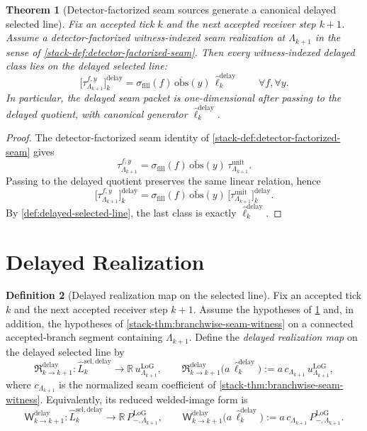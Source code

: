 \documentclass[11pt]{article}
\theoremstyle{definition}
\newtheorem{definition}{Definition}[section]
\theoremstyle{plain}
\newtheorem{theorem}[definition]{Theorem}
\theoremstyle{remark}
\begin{document}
\begin{theorem}[Detector-factorized seam sources generate a canonical delayed selected line]
\label{thm:delayed-selected-line}
Fix an accepted tick \(k\) and the next accepted receiver step \(k+1\).
Assume a detector-factorized witness-indexed seam realization at \(\Lambda_{k+1}\) in the sense of
\cref{stack-def:detector-factorized-seam}.
Then every witness-indexed delayed class lies on the delayed selected line:
\[
\big[\tau^{f,y}_{\Lambda_{k+1}}\big]^{\mathrm{delay}}_k
=
\sigma_{\mathrm{fill}}(f)\,
\overline{\mathrm{obs}}(y)\,
\widehat\ell^{\mathrm{delay}}_k
\qquad
\forall f,\forall y.
\]
In particular, the delayed seam packet is one-dimensional after passing to the delayed quotient,
with canonical generator \(\widehat\ell^{\mathrm{delay}}_k\).
\end{theorem}

\begin{proof}
The detector-factorized seam identity of \cref{stack-def:detector-factorized-seam} gives
\[
\tau^{f,y}_{\Lambda_{k+1}}
=
\sigma_{\mathrm{fill}}(f)\,
\overline{\mathrm{obs}}(y)\,
\tau^{\mathrm{unit}}_{\Lambda_{k+1}}.
\]
Passing to the delayed quotient preserves the same linear relation, hence
\[
\big[\tau^{f,y}_{\Lambda_{k+1}}\big]^{\mathrm{delay}}_k
=
\sigma_{\mathrm{fill}}(f)\,
\overline{\mathrm{obs}}(y)\,
\big[\tau^{\mathrm{unit}}_{\Lambda_{k+1}}\big]^{\mathrm{delay}}_k.
\]
By \cref{def:delayed-selected-line}, the last class is exactly
\(
\widehat\ell^{\mathrm{delay}}_k
\).
\end{proof}

\section{Delayed Realization}

\begin{definition}[Delayed realization map on the selected line]
\label{def:delayed-response-map}
Fix an accepted tick \(k\) and the next accepted receiver step \(k+1\).
Assume the hypotheses of \cref{thm:delayed-selected-line} and, in addition, the hypotheses of
\cref{stack-thm:branchwise-seam-witness} on a connected accepted-branch segment containing
\(\Lambda_{k+1}\).
Define the \emph{delayed realization map} on the delayed selected line by
\[
\mathfrak R^{\mathrm{delay}}_{k\to k+1}
:
\widehat L^{\mathrm{sel,delay}}_k
\longrightarrow
\mathbb R\,u^{\mathrm{LoG}}_{\Lambda_{k+1}},
\qquad
\mathfrak R^{\mathrm{delay}}_{k\to k+1}\!\big(a\,\widehat\ell^{\mathrm{delay}}_k\big)
:=
a\,c_{\Lambda_{k+1}}\,u^{\mathrm{LoG}}_{\Lambda_{k+1}},
\]
where \(c_{\Lambda_{k+1}}\) is the normalized seam coefficient of
\cref{stack-thm:branchwise-seam-witness}.
Equivalently, its reduced welded-image form is
\[
\mathsf W^{\mathrm{delay}}_{k\to k+1}
:
\widehat L^{\mathrm{sel,delay}}_k
\longrightarrow
\mathbb R\,P^{\mathrm{LoG}}_{-,\Lambda_{k+1}},
\qquad
\mathsf W^{\mathrm{delay}}_{k\to k+1}\!\big(a\,\widehat\ell^{\mathrm{delay}}_k\big)
:=
a\,c_{\Lambda_{k+1}}\,P^{\mathrm{LoG}}_{-,\Lambda_{k+1}}.
\]
\end{definition}
\end{document}
